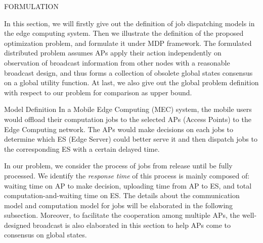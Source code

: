 \documentclass[10pt, conference, letterpaper]{IEEEtran}
\begin{document}
    \begin{section}{FORMULATION}
        \label{sec:formulation}

        In this section, we will firstly give out the definition of job dispatching models in the edge computing system. Then we illustrate the definition of the proposed optimization problem, and formulate it under MDP framework. The formulated distributed problem assumes APs apply their action independently on observation of broadcast information from other nodes with a reasonable broadcast design, and thus forms a collection of obsolete global states consensus on a global utility function. At last, we also give out the global problem definition with respect to our problem for comparison as upper bound.

        \begin{subsection}{Model Definition}
            In a Mobile Edge Computing (MEC) system, the mobile users would offload their computation jobs to the selected APs (Access Points) to the Edge Computing network. The APs would make decisions on each jobs to determine which ES (Edge Server) could better serve it and then dispatch jobs to the corresponding ES with a certain delayed time.
            
            In our problem, we consider the process of jobs from release until be fully processed. We identify the \emph{response time} of this process is mainly composed of: waiting time on AP to make decision, uploading time from AP to ES, and total computation-and-waiting time on ES.
            The details about the communication model and computation model for jobs will be elaborated in the following subsection. Moreover, to facilitate the cooperation among multiple APs, the well-designed broadcast is also elaborated in this section to help APs come to consensus on global states.
            

\end{subsection}
\end{section}
\end{document}
